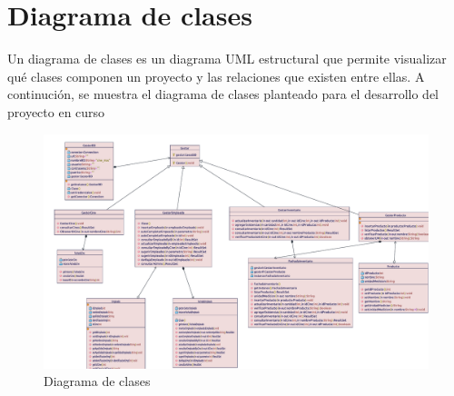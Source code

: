 \chapter{Diagrama de clases}
Un diagrama de clases es un diagrama UML estructural que permite visualizar qué clases componen un proyecto y las relaciones que existen entre ellas. A continución, se muestra el diagrama de clases planteado para el desarrollo del proyecto en curso
\begin{figure}[h!]
	\centering
	\includegraphics[scale=0.4]{diseno/clases/imgs/clases}
	\caption{Diagrama de clases}
\end{figure}

